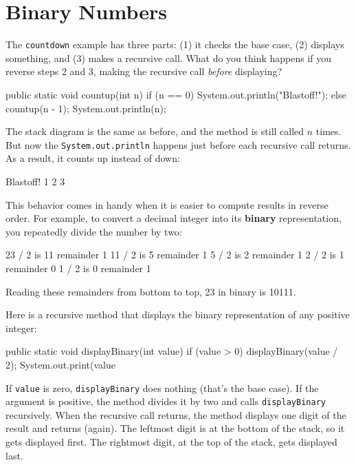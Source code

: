 \documentclass[12pt]{book}
\theoremstyle{exercise}
\newcommand{\java}[1]{\verb"#1"}
\begin{document}
\section{Binary Numbers}

The \java{countdown} example has three parts: (1) it checks the base case, (2) displays something, and (3) makes a recursive call.
What do you think happens if you reverse steps 2 and 3, making the recursive call {\it before} displaying?

\begin{code}
    public static void countup(int n) {
        if (n == 0) {
            System.out.println("Blastoff!");
        } else {
            countup(n - 1);
            System.out.println(n);
        }
    }
\end{code}

The stack diagram is the same as before, and the method is still called $n$ times.
But now the \java{System.out.println} happens just before each recursive call returns.
As a result, it counts up instead of down:

\begin{stdout}
Blastoff!
1
2
3
\end{stdout}

This behavior comes in handy when it is easier to compute results in reverse order.
For example, to convert a decimal integer into its {\bf binary} representation, you repeatedly divide the number by two:

\begin{stdout}
23 / 2 is 11 remainder 1
11 / 2 is  5 remainder 1
 5 / 2 is  2 remainder 1
 2 / 2 is  1 remainder 0
 1 / 2 is  0 remainder 1
\end{stdout}

Reading these remainders from bottom to top, 23 in binary is 10111.


Here is a recursive method that displays the binary representation of any positive integer:

\begin{code}
    public static void displayBinary(int value) {
        if (value > 0) {
            displayBinary(value / 2);
            System.out.print(value %
        }
    }
\end{code}

If \java{value} is zero, \java{displayBinary} does nothing (that's the base case).
If the argument is positive, the method divides it by two and calls \java{displayBinary} recursively.
When the recursive call returns, the method displays one digit of the result and returns (again).
The leftmost digit is at the bottom of the stack, so it gets displayed first.
The rightmost digit, at the top of the stack, gets displayed last.
\end{document}

